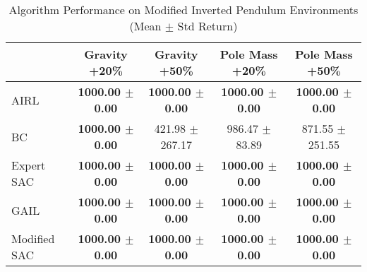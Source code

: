 \documentclass{article}
\begin{document}
\pagestyle{empty}

\begin{table}
\caption{Algorithm Performance on Modified Inverted Pendulum Environments (Mean $\pm$ Std Return)}
\label{tab:perf_mod_invpend}
\begin{adjustbox}{max width=\textwidth, center}
\begin{tabular}{lcccc}
\toprule
 & Gravity +20\% & Gravity +50\% & Pole Mass +20\% & Pole Mass +50\% \\
\midrule
AIRL & \textbf{1000.00 $\pm$ 0.00} & \textbf{1000.00 $\pm$ 0.00} & \textbf{1000.00 $\pm$ 0.00} & \textbf{1000.00 $\pm$ 0.00} \\
BC & \textbf{1000.00 $\pm$ 0.00} & 421.98 $\pm$ 267.17 & 986.47 $\pm$ 83.89 & 871.55 $\pm$ 251.55 \\
Expert SAC & \textbf{1000.00 $\pm$ 0.00} & \textbf{1000.00 $\pm$ 0.00} & \textbf{1000.00 $\pm$ 0.00} & \textbf{1000.00 $\pm$ 0.00} \\
GAIL & \textbf{1000.00 $\pm$ 0.00} & \textbf{1000.00 $\pm$ 0.00} & \textbf{1000.00 $\pm$ 0.00} & \textbf{1000.00 $\pm$ 0.00} \\
Modified SAC & \textbf{1000.00 $\pm$ 0.00} & \textbf{1000.00 $\pm$ 0.00} & \textbf{1000.00 $\pm$ 0.00} & \textbf{1000.00 $\pm$ 0.00} \\
\bottomrule
\end{tabular}
\end{adjustbox}
\end{table}
\end{document}
